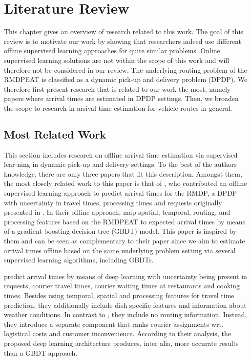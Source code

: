 \chapter{Literature Review}
\label{chap:review}
This chapter gives an overview of research related to this work. The goal of this review is to motivate our work by showing that researchers indeed use different offline supervised learning approaches for quite similar problems. Online supervised learning solutions are not within the scope of this work and will therefore not be considered in our review. The underlying routing problem of the RMDPEAT is classified as a dynamic pick-up and delivery problem (DPDP). We therefore first present research that is related to our work the most, namely papers where arrival times are estimated in DPDP settings. Then, we broaden the scope to research in arrival time estimation for vehicle routes in general.    

\section{Most Related Work}
\label{sec:msr}
This section includes research on offline arrival time estimation via supervised lear-ning in dynamic pick-up and delivery settings.
To the best of the authors knowledge, there are only three papers that fit this description. Amongst them, the most closely related work to this paper is that of \citet{Hildebrandt2020_EAT}, who contributed an offline supervised learning approach to predict arrival times for the RMDP, a DPDP with uncertainty in travel times, processing times and requests originally presented in \citet{UlmerRMDP}.
In their offline approach, \citet{Hildebrandt2020_EAT} map spatial, temporal, routing, and processing features based on the RMDPEAT to expected arrival times by means of a gradient boosting decision tree (GBDT) model. This paper is inspired by them and can be seen as complementary to their paper since we aim to estimate arrival times offline based on the same underlying problem setting via several supervised learning algorithms, including GBDTs.

\citet{Zhu2020_OFCTE_DL} predict arrival times by means of deep learning with uncertainty being present in requests, courier travel times, courier waiting times at restaurants and cooking times. Besides using temporal, spatial and processing features for travel time prediction, they additionally include dish specific features and information about weather conditions. In contrast to \citet{Hildebrandt2020_EAT}, they include no routing information. Instead, they introduce a separate component that ranks courier assignments wrt. logistical costs and customer inconvenience. According to their analysis, the proposed deep learning architecture produces, inter alia, more accurate results than a GBDT approach.

